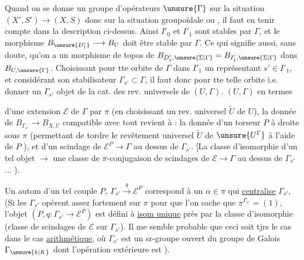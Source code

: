 
Quand on se donne un groupe d'opérateurs $\unsure{\Gamma}$ sur la situation $(X',S')\longrightarrow(X,S)$ donc sur la situation groupoïdale ou , il faut en tenir compte dans la description ci-dessus.
Ainsi $I'_0$ et $I'_1$ sont stables par $\Gamma$, et le morphisme  $B_{\unsure{D'_1}}\longrightarrow B_U$ doit être stable par $\Gamma$.
Ce qui signifie aussi, sans doute, qu'on a un morphisme de topos de
$B_{D'_1,\unsure{\Sigma|\Gamma}}=B_{I'_1,\unsure{\Sigma|\Gamma}}$
dans $B_{U,\unsure{\Gamma}}$.
Choisissant pour tte orbite de $\Gamma$ dans $I'_1$ un représentant $s'\in I'_1$, et considérant son stabilisateur $\Gamma_{s'}\subset\Gamma$, il faut donc pour tte telle orbite i.e.\    donner un $\Gamma_{s'}$ objet de la cat. des rev. universels de $(U,\Gamma)$.
   $(U,\Gamma)$ en termes


d'une extension $\mathcal E$ de \deleted{\unsure{$\Sigma$}} $\Gamma$ par $\pi$ (en choisissant un rev. universel $\widetilde U$ de $U$), la donnée de $B_{\Gamma_{s'}}\longrightarrow B_{X,U}$ compatible avec tout revient  à : la donnée d'un torseur $P$ à droite sous $\pi$ (permettant de tordre le revêtement universel  $\widetilde U$ de $\unsure{U^\Gamma}$ à l'aide de $P$  ), et d'un scindage de $\mathcal E^P\longrightarrow\Gamma$ au dessus de $\Gamma_{s'}$.
[La classe d'isomorphie d'un tel objet $\longrightarrow$ une classe de $\pi$-conjugaison de scindages de $\mathcal E\longrightarrow\Gamma$ au dessus de $\Gamma_{s'}$... ).

Un autom d'un tel couple  $P,\ \Gamma_{s'}\xrightarrow{q}\mathcal E^P$ correspond à un $\alpha\in\pi$ qui \uline{centralise} $\Gamma_{s'}$,  (Si les $\Gamma_{s'}$ opèrent assez fortement sur $\pi$ pour que l'on sache que $\pi^{\Gamma_{s'}}=(1)$, l'objet $(P,q:\Gamma_{s'}\longrightarrow\mathcal E^P)$ est défini à \uline{isom unique} près par la classe d'isomorphie  (classe de scindages de $\mathcal E$ sur $\Gamma_{s'}$).
\margin{\unsure{!!|!!!}}
Il me semble probable que ceci soit tjrs le cas dans le cas \uline{arithmétique}, où $\Gamma_{s'}$ est un sr-groupe ouvert du groupe de Galois $\Gamma_{\unsure{k|K}}$ dont l'opération extérieure est ).

